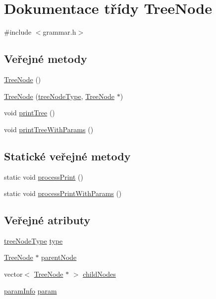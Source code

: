 \hypertarget{class_tree_node}{
\section{Dokumentace třídy TreeNode}
\label{class_tree_node}
}


{\ttfamily \#include $<$grammar.h$>$}

\subsection*{Veřejné metody}
\begin{DoxyCompactItemize}
\item 
\hyperlink{class_tree_node_a984a98d5ccf7ef1f5a18094c6821f35d}{TreeNode} ()
\item 
\hyperlink{class_tree_node_af7a347fde3cffd7402b523bda59378b8}{TreeNode} (\hyperlink{rules_8h_a5a27f914c36515e90cdc5728872c6b14}{treeNodeType}, \hyperlink{class_tree_node}{TreeNode} $\ast$)
\item 
void \hyperlink{class_tree_node_a7dd66aecfe3c0d992fe5b37c4036849a}{printTree} ()
\item 
void \hyperlink{class_tree_node_a48aa6a3483d2046fcdffe51d1c23714a}{printTreeWithParams} ()
\end{DoxyCompactItemize}
\subsection*{Statické veřejné metody}
\begin{DoxyCompactItemize}
\item 
static void \hyperlink{class_tree_node_a1956a28ff0352a94226d1345160e4b3e}{processPrint} ()
\item 
static void \hyperlink{class_tree_node_a2edb10371f21391d0fd5140a78587851}{processPrintWithParams} ()
\end{DoxyCompactItemize}
\subsection*{Veřejné atributy}
\begin{DoxyCompactItemize}
\item 
\hyperlink{rules_8h_a5a27f914c36515e90cdc5728872c6b14}{treeNodeType} \hyperlink{class_tree_node_abdd5d246de62fe64cf3b76177969fd2c}{type}
\item 
\hyperlink{class_tree_node}{TreeNode} $\ast$ \hyperlink{class_tree_node_a30ca20ef8f51fe101b20b10b3265ef0d}{parentNode}
\item 
vector$<$ \hyperlink{class_tree_node}{TreeNode} $\ast$ $>$ \hyperlink{class_tree_node_a348136639185d4a6863c01229843fe5f}{childNodes}
\item 
\hyperlink{structd}{paramInfo} \hyperlink{class_tree_node_a984e95b48f62382300e2180da17d1cb9}{param}
\end{DoxyCompactItemize}
